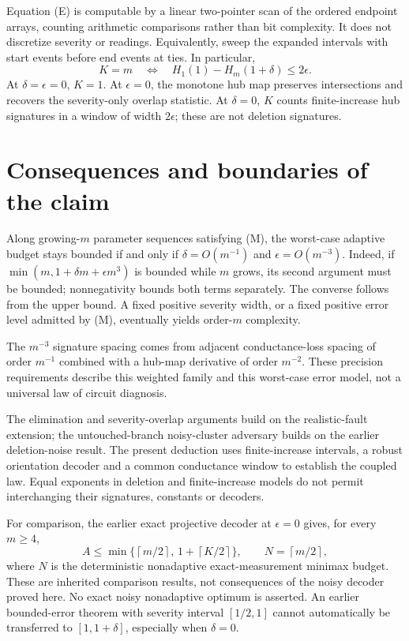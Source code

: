 \documentclass[11pt,letterpaper]{article}
\newcommand{\ceil}[1]{\left\lceil #1\right\rceil}
\begin{document}
Equation (E) is computable by a linear two-pointer scan of the ordered endpoint arrays, counting arithmetic comparisons rather than bit complexity. It does not discretize severity or readings. Equivalently, sweep the expanded intervals with start events before end events at ties. In particular,
\[
 K=m\quad\Longleftrightarrow\quad H_1(1)-H_m(1+\delta)\le2\epsilon.
\]
At $\delta=\epsilon=0$, $K=1$. At $\epsilon=0$, the monotone hub map preserves intersections and recovers the severity-only overlap statistic. At $\delta=0$, $K$ counts finite-increase hub signatures in a window of width $2\epsilon$; these are not deletion signatures.

\section{Consequences and boundaries of the claim}
Along growing-$m$ parameter sequences satisfying (M), the worst-case adaptive budget stays bounded if and only if $\delta=O(m^{-1})$ and $\epsilon=O(m^{-3})$. Indeed, if $\min(m,1+\delta m+\epsilon m^3)$ is bounded while $m$ grows, its second argument must be bounded; nonnegativity bounds both terms separately. The converse follows from the upper bound. A fixed positive severity width, or a fixed positive error level admitted by (M), eventually yields order-$m$ complexity.

The $m^{-3}$ signature spacing comes from adjacent conductance-loss spacing of order $m^{-1}$ combined with a hub-map derivative of order $m^{-2}$. These precision requirements describe this weighted family and this worst-case error model, not a universal law of circuit diagnosis.

The elimination and severity-overlap arguments build on the realistic-fault extension; the untouched-branch noisy-cluster adversary builds on the earlier deletion-noise result. The present deduction uses finite-increase intervals, a robust orientation decoder and a common conductance window to establish the coupled law. Equal exponents in deletion and finite-increase models do not permit interchanging their signatures, constants or decoders.

For comparison, the earlier exact projective decoder at $\epsilon=0$ gives, for every $m\ge4$,
\[
 A\le\min\{\ceil{m/2},\,1+\ceil{K/2}\},\qquad N=\ceil{m/2},
\]
where $N$ is the deterministic nonadaptive exact-measurement minimax budget. These are inherited comparison results, not consequences of the noisy decoder proved here. No exact noisy nonadaptive optimum is asserted. An earlier bounded-error theorem with severity interval $[1/2,1]$ cannot automatically be transferred to $[1,1+\delta]$, especially when $\delta=0$.
\end{document}

